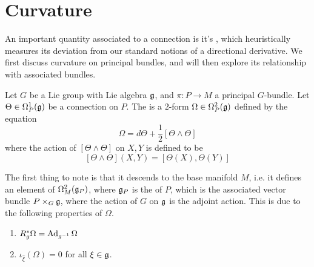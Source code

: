 %
\section{Curvature}
%
An important quantity associated to a connection is it's , which
heuristically measures its deviation from our standard notions of a directional
derivative. We first discuss curvature on principal bundles, and will then
explore its relationship with associated bundles.
%
\begin{defn}
Let $G$ be a Lie group with Lie algebra $\mathfrak{g}$, and $\pi : P \to M$ a principal $G$-bundle.
Let $\Theta \in \Omega_P^1(\mathfrak{g})$ be a connection on $P$. The  is
a $2$-form $\Omega \in \Omega_P^2(\mathfrak{g})$ defined by the equation
\[
\Omega = d\Theta + \frac{1}{2}[\Theta \wedge \Theta]
\]
where the action of $[\Theta \wedge \Theta]$ on $X,Y$ is defined to be
\[
[\Theta \wedge \Theta](X,Y) = [\Theta(X), \Theta(Y)]
\]
\end{defn}
%
The first thing to note is that it descends to the base manifold $M$, i.e. it defines
an element of $\Omega_M^2(\mathfrak{g}_P)$, where $\mathfrak{g}_P$ is the  of $P$,
which is the associated vector bundle $P \times_G \mathfrak{g}$, where the action of $G$ on
$\mathfrak{g}$ is the adjoint action. This is due to the following properties of $\Omega$.
%
\begin{prop} \enumbreak
\begin{enumerate}
  \item $R_g^*\Omega = \operatorname{Ad}_{g^{-1}}\Omega$
  \item $\iota_{\widehat{\xi}}(\Omega) = 0$ for all $\xi \in \mathfrak{g}$.
\end{enumerate}
\end{prop}
%
